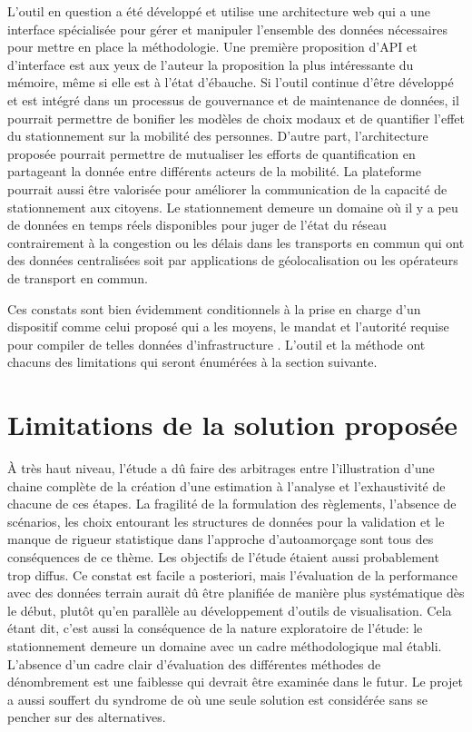         L'outil en question a été développé et utilise une architecture web qui a une interface spécialisée pour gérer et manipuler l'ensemble des données nécessaires pour mettre en place la méthodologie. Une première proposition d'\ac{API} et d'interface est aux yeux de l'auteur la proposition la plus intéressante du mémoire, même si elle est à l'état d'ébauche. Si l'outil continue d'être développé et est intégré dans un processus de gouvernance et de maintenance de données, il pourrait permettre de bonifier les modèles de choix modaux et de quantifier l'effet du stationnement sur la mobilité des personnes. D'autre part, l'architecture proposée pourrait permettre de mutualiser les efforts de quantification en partageant la donnée entre différents acteurs de la mobilité. La plateforme pourrait aussi être valorisée pour améliorer la communication de la capacité de stationnement aux citoyens. Le stationnement demeure un domaine où il y a peu de données en temps réels disponibles pour juger de l'état du réseau contrairement à la congestion ou les délais dans les transports en commun qui ont des données centralisées soit par applications de géolocalisation ou les opérateurs de transport en commun. \par
     Ces constats sont bien évidemment conditionnels à la prise en charge d'un dispositif comme celui proposé qui a les moyens, le mandat et l'autorité requise pour compiler de telles données d'infrastructure \parencite{cohon_measuring_1996}. L'outil et la méthode ont chacuns des limitations qui seront énumérées à la section suivante.
\section{Limitations de la solution proposée}\label{sec:Limitations}
    À très haut niveau, l'étude a dû faire des arbitrages entre l'illustration d'une chaine complète de la création d'une estimation à l'analyse et l'exhaustivité de chacune de ces étapes. La fragilité de la formulation des règlements, l'absence de scénarios, les choix entourant les structures de données pour la validation et le manque de rigueur statistique dans l'approche d'autoamorçage sont tous des conséquences de ce thème. Les objectifs de l'étude étaient aussi probablement trop diffus. Ce constat est facile a posteriori, mais l'évaluation de la performance avec des données terrain aurait dû être planifiée de manière plus systématique dès le début, plutôt qu'en parallèle au développement d'outils de visualisation. Cela étant dit, c'est aussi la conséquence de la nature exploratoire de l'étude: le stationnement demeure un domaine avec un cadre méthodologique mal établi. L'absence d'un cadre clair d'évaluation des différentes méthodes de dénombrement est une faiblesse qui devrait être examinée dans le futur. Le projet a aussi souffert du syndrome de \fg{} \parencite{kahneman_thinking_2011,flyvbjerg_how_2023} où une seule solution est considérée sans se pencher sur des alternatives.
    
